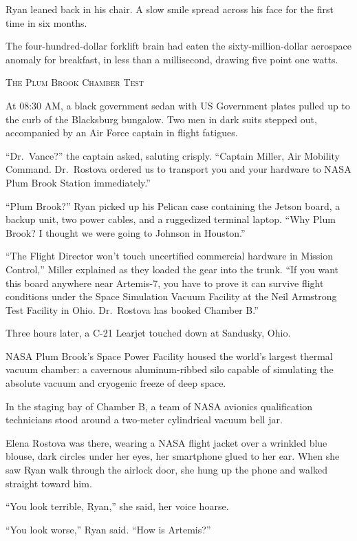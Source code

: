 \documentclass[12pt,twoside,openright]{book}
\newcommand{\sceneheader}[1]{%
  \par\vspace{1.8em}%
  {\noindent\centering\scshape\large #1\par}%
  \vspace{1.0em}%
  \noindent%
}
\newcommand{\dinkus}{%
  \par\vspace{1.2em}%
  {\noindent\centering{\large $\ast\quad\ast\quad\ast$}\par}%
  \vspace{1.2em}%
  \noindent%
}
\begin{document}
Ryan leaned back in his chair. A slow smile spread across his face for
the first time in six months.

The four-hundred-dollar forklift brain had eaten the
sixty-million-dollar aerospace anomaly for breakfast, in less than a
millisecond, drawing five point one watts.

\dinkus

\sceneheader{The Plum Brook Chamber
Test}

At 08:30 AM, a black government sedan with US Government plates pulled
up to the curb of the Blacksburg bungalow. Two men in dark suits stepped
out, accompanied by an Air Force captain in flight fatigues.

``Dr.~Vance?'' the captain asked, saluting crisply. ``Captain Miller,
Air Mobility Command. Dr.~Rostova ordered us to transport you and your
hardware to NASA Plum Brook Station immediately.''

``Plum Brook?'' Ryan picked up his Pelican case containing the Jetson
board, a backup unit, two power cables, and a ruggedized terminal
laptop. ``Why Plum Brook? I thought we were going to Johnson in
Houston.''

``The Flight Director won't touch uncertified commercial hardware in
Mission Control,'' Miller explained as they loaded the gear into the
trunk. ``If you want this board anywhere near Artemis-7, you have to
prove it can survive flight conditions under the Space Simulation Vacuum
Facility at the Neil Armstrong Test Facility in Ohio. Dr.~Rostova has
booked Chamber B.''

Three hours later, a C-21 Learjet touched down at Sandusky, Ohio.

NASA Plum Brook's Space Power Facility housed the world's largest
thermal vacuum chamber: a cavernous aluminum-ribbed silo capable of
simulating the absolute vacuum and cryogenic freeze of deep space.

In the staging bay of Chamber B, a team of NASA avionics qualification
technicians stood around a two-meter cylindrical vacuum bell jar.

Elena Rostova was there, wearing a NASA flight jacket over a wrinkled
blue blouse, dark circles under her eyes, her smartphone glued to her
ear. When she saw Ryan walk through the airlock door, she hung up the
phone and walked straight toward him.

``You look terrible, Ryan,'' she said, her voice hoarse.

``You look worse,'' Ryan said. ``How is Artemis?''
\end{document}
